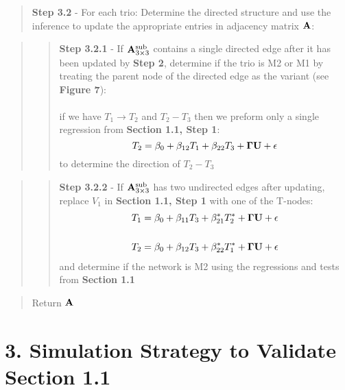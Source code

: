\documentclass[12pt]{report}
\begin{document}
\begin{quote}
\noindent \textbf{Step 3.2} -  For each trio: Determine the directed structure and use the inference to update the appropriate entries in adjacency matrix $\bf{A}$:\\
\end{quote}

\begin{quote}
\begin{quote}
\noindent \textbf{Step 3.2.1} - If ${\bf A}_{3\times3}^{\text{sub}}$ contains a single directed edge after it has been updated by \textbf{Step 2}, determine if the trio is M2 or M1 by treating the parent node of the directed edge as the variant (see \textbf{Figure 7}): \\
\\
if we have $T_1 \rightarrow T_2$ and $T_2 - T_3$ then we preform only a single regression from \textbf{Section 1.1, Step 1}:
\[ T_2 = \beta_0 + \beta_{12}T_1 + \beta_{22} T_3 + {\bf \Gamma U} + \epsilon \] 
to determine the direction of $T_2 - T_3$\\
\end{quote}
\end{quote}

\begin{quote}
\begin{quote}
\noindent\textbf{Step 3.2.2} - If ${\bf A}_{3\times3}^{\text{sub}}$ has two undirected edges after updating, replace $V_1$ in \textbf{Section 1.1, Step 1} with one of the T-nodes:
\begin{eqnarray}
T_1 = \beta_0 +\beta_{11}T_3+\beta_{21}^{\ast}T_2^{\ast}+{\bf \Gamma U}+ \epsilon \\
\nonumber\\
T_2 = \beta_0 +\beta_{12}T_3+\beta_{22}^{\ast}T_1^{\ast}+{\bf \Gamma U}+ \epsilon 
\end{eqnarray}
and determine if the network is M2 using the regressions and tests from \textbf{Section 1.1}\\
\end{quote} 
\end{quote}

\begin{quote}
Return $\bf A$
\end{quote}

\section*{3. Simulation Strategy to Validate Section 1.1}
\end{document}
